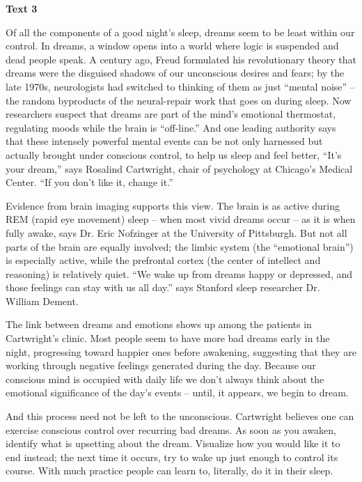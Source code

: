 
\begin{center}\textbf{Text 3}\end{center}

\qquad Of all the components of a good night's sleep, dreams seem to be least within our control. In dreams, a window opens into a world where logic is suspended and dead people speak. A century ago, Freud formulated his revolutionary theory that dreams were the disguised shadows of our unconscious desires and fears; by the late 1970s, neurologists had switched to thinking of them as just ``mental noise'' -- the random byproducts of the neural-repair work that goes on during sleep. Now researchers suspect that dreams are part of the mind's emotional thermostat, regulating moods while the brain is ``off-line.'' And one leading authority says that these intensely powerful mental events can be not only harnessed but actually brought under conscious control, to help us sleep and feel better, ``It's your dream,'' says Rosalind Cartwright, chair of psychology at Chicago's Medical Center. ``If you don't like it, change it.''

\qquad Evidence from brain imaging supports this view. The brain is as active during REM (rapid eye movement) sleep -- when most vivid dreams occur -- as it is when fully awake, says Dr. Eric Nofzinger at the University of Pittsburgh. But not all parts of the brain are equally involved; the limbic system (the ``emotional brain'') is especially active, while the prefrontal cortex (the center of intellect and reasoning) is relatively quiet. ``We wake up from dreams happy or depressed, and those feelings can stay with us all day.'' says Stanford sleep researcher Dr. William Dement.

\qquad The link between dreams and emotions shows up among the patients in Cartwright's clinic. Most people seem to have more bad dreams early in the night, progressing toward happier ones before awakening, suggesting that they are working through negative feelings generated during the day. Because our conscious mind is occupied with daily life we don't always think about the emotional significance of the day's events -- until, it appears, we begin to dream.

\qquad And this process need not be left to the unconscious. Cartwright believes one can exercise conscious control over recurring bad dreams. As soon as you awaken, identify what is upsetting about the dream. Visualize how you would like it to end instead; the next time it occurs, try to wake up just enough to control its course. With much practice people can learn to, literally, do it in their sleep.

